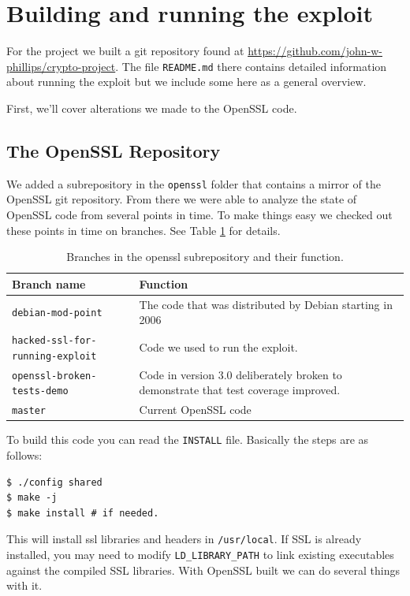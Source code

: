 \documentclass[conference]{IEEEtran}
\begin{document}
\appendices{}
\section{Building and running the exploit}
For the project we built a git repository found at
\url{https://github.com/john-w-phillips/crypto-project}. The file
\verb|README.md| there contains detailed information about running the
exploit but we include some here as a general overview.

First, we'll cover alterations we made to the OpenSSL code.

\subsection{The OpenSSL Repository}
We added a subrepository in the \verb|openssl| folder that contains a
mirror of the OpenSSL git repository. From there we were able to
analyze the state of OpenSSL code from several points in time. To make
things easy we checked out these points in time on branches. See
Table \ref{branches} for details.

\begin{table}[!t]
  \centering
  \begin{tabular}{|l|l|}
    \hline
    Branch name & Function \\ \hline
    \verb|debian-mod-point| & The code that was distributed by Debian starting in 2006 \\ \hline
    \verb|hacked-ssl-for-running-exploit| & Code we used to run the exploit. \\ \hline
    \verb|openssl-broken-tests-demo| & Code in version 3.0 deliberately broken to demonstrate that test coverage improved. \\ \hline
    \verb|master| & Current OpenSSL code \\ \hline
  \end{tabular}
  \caption{Branches in the openssl subrepository and their function.}
  \label{branches}
\end{table}

To build this code you can read the \verb|INSTALL| file. Basically the
steps are as follows:

\begin{verbatim}
$ ./config shared
$ make -j
$ make install # if needed.
\end{verbatim}

This will install ssl libraries and headers in \verb|/usr/local|. If
SSL is already installed, you may need to modify
\verb|LD_LIBRARY_PATH| to link existing executables against the
compiled SSL libraries.  With OpenSSL built we can do several things
with it.
\end{document}

